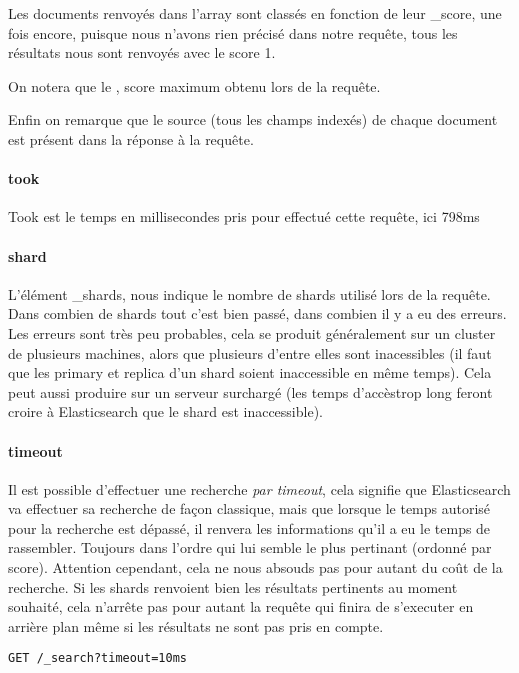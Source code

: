 {Les documents renvoyés dans l'array sont classés en fonction de leur \_score, une 
fois encore, puisque nous n'avons rien précisé dans notre requête, tous les résultats 
nous sont renvoyés avec le score 1.

On notera que le , score maximum obtenu lors de la requête.

Enfin on remarque que le source (tous les champs indexés) de chaque document est présent
dans la réponse à la requête.

\paragraph{took}
Took est le temps en millisecondes pris pour effectué cette requête, ici 798ms

\paragraph{shard}
L'élément \_shards, nous indique le nombre de shards utilisé lors de la requête. 
Dans combien de shards tout c'est bien passé, dans combien il y a eu des erreurs.
Les erreurs sont très peu probables, cela se produit généralement sur un cluster 
de plusieurs machines, alors que plusieurs d'entre elles sont inacessibles (il faut 
que les primary et replica d'un shard soient inaccessible en même temps). Cela peut aussi produire sur un serveur surchargé (les temps d'accèstrop long feront croire à Elasticsearch que le shard est inaccessible).

\paragraph{timeout}
Il est possible d'effectuer une recherche \textit{par timeout}, cela signifie que 
Elasticsearch va effectuer sa recherche de façon classique, mais que lorsque le temps
autorisé pour la recherche est dépassé, il renvera les informations 
qu'il a eu le temps de rassembler. Toujours dans l'ordre qui lui semble le plus pertinant
(ordonné par score). Attention cependant, cela ne nous absouds pas pour autant du
coût de la recherche. Si les shards renvoient bien les résultats pertinents au moment
souhaité, cela n'arrête pas pour autant la requête qui finira de s'executer en arrière
plan même si les résultats ne sont pas pris en compte.

\begin{lstlisting}[style=code,label={lst:APIsearchemptyexample3},caption={Une recherche "vide" avec timeout}]
GET /_search?timeout=10ms
\end{lstlisting}


}

